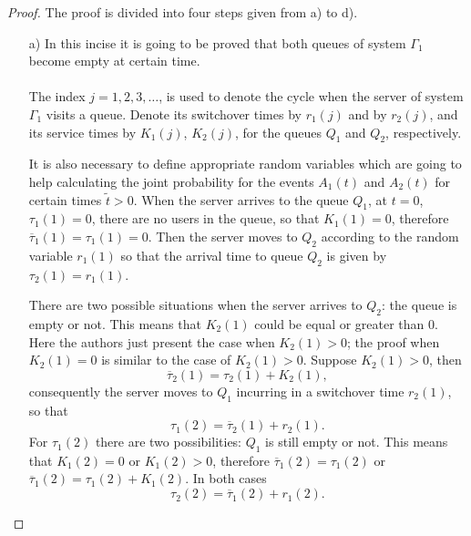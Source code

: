 \documentclass{article}
\begin{document}
\begin{proof}
The proof is divided into four steps given from a) to d).
\begin{itemize}
\item[a) ] 
In this incise it is going to be proved that both queues of system $\Gamma_{1}$ become empty at certain time. \\\\
The index $j=1,2,3,\ldots$, is used to denote the cycle when the server of system $\Gamma_{1}$ visits a queue. Denote its switchover times  by $r_{1}\left(j\right)$ and by $r_{2}\left(j\right)$, and its service times by $K_{1}\left(j\right)$, $K_{2}\left(j\right)$, for the queues $Q_{1}$ and $Q_{2}$,  respectively.\medskip

It is also necessary to define appropriate random variables which are going to help calculating the joint probability for the events $A_{1}\left(t\right)$ and $A_{2}\left(t\right)$ for certain times $\tilde{t}>0$. When the server arrives to the queue $Q_{1}$, at $t=0$, $\tau_{1}\left(1\right)=0$, there are no users in the queue, so that $K_{1}\left(1\right)=0$, therefore $\overline{\tau}_{1}\left(1\right)=\tau_{1}\left(1\right)=0$. Then the server moves to $Q_{2}$ according to the random variable $r_{1}\left(1\right)$ so that the arrival time to queue $Q_{2}$ is given by $\tau_{2}\left(1\right)=r_{1}\left(1\right)$.\medskip

There are two  possible situations when the server arrives to $Q_{2}$: the queue is empty or not. This means that $K_{2}\left(1\right)$ could be equal or greater than $0$. Here the authors just present the case when $K_{2}\left(1\right)>0$; the proof when $ K_{2}\left(1\right)=0$ is similar to the case of $K_{2}\left(1\right)>0$. Suppose $K_{2}\left(1\right)>0$, then $$\overline{\tau}_{2}\left(1\right)=\tau_{2}\left(1\right)+K_{2}\left(1\right),$$ consequently the server moves to $Q_{1}$ incurring in a switchover time $r_{2}\left(1\right)$, so that $$\tau_{1}\left(2\right)=\overline{\tau}_{2}\left(1\right)+r_{2}\left(1\right).$$
For $\tau_{1}\left(2\right)$ there are two possibilities: $Q_{1}$ is still empty or not. This means that $K_{1}\left(2\right)=0$ or $K_{1}\left(2\right)>0$, therefore $\overline{\tau}_{1}\left(2\right)=\tau_{1}\left(2\right)$ or  $\overline{\tau}_{1}\left(2\right)=\tau_{1}\left(2\right)+K_{1}\left(2\right)$. In both cases $$\tau_{2}\left(2\right)=\overline{\tau}_{1}\left(2\right)+r_{1}\left(2\right).$$


\end{itemize}
\end{proof}
\end{document}
